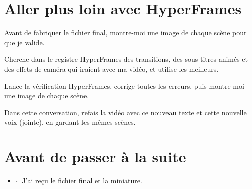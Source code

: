 \documentclass[11pt,oneside,openany]{book}
\newcommand{\coche}{$\square$\ }
\newenvironment{bilan}{\section*{Avant de passer à la suite}\begin{itemize}[label={}]}{\end{itemize}}
\begin{document}
\section{Aller plus loin avec HyperFrames}
\begin{acopier}
Avant de fabriquer le fichier final, montre-moi une image de chaque scène pour que je valide.
\end{acopier}
\begin{acopier}
Cherche dans le registre HyperFrames des transitions, des sous-titres animés et des effets de caméra qui iraient avec ma vidéo, et utilise les meilleurs.
\end{acopier}
\begin{acopier}
Lance la vérification HyperFrames, corrige toutes les erreurs, puis montre-moi une image de chaque scène.
\end{acopier}
\begin{acopier}
Dans cette conversation, refais la vidéo avec ce nouveau texte et cette nouvelle voix (jointe), en gardant les mêmes scènes.
\end{acopier}

\begin{bilan}
  \item \coche J'ai reçu le fichier final et la miniature.
\end{bilan}

\end{document}
